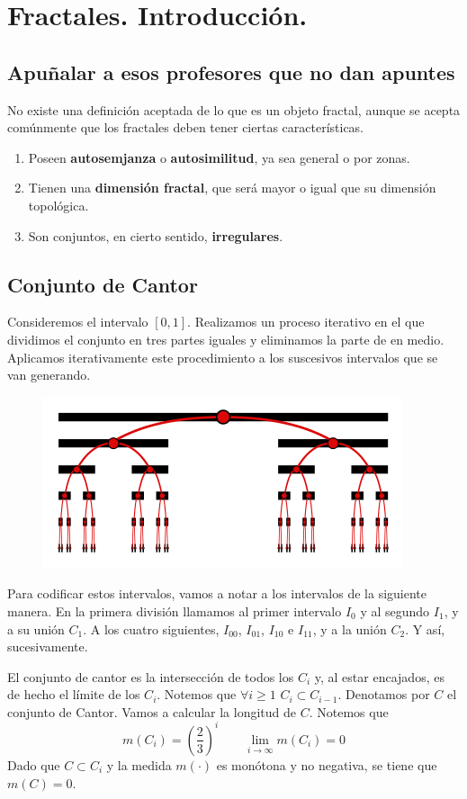 \documentclass[FyPI.tex]{subfiles}
\begin{document}
\chapter{Fractales. Introducción.}
\section{Apuñalar a esos profesores que no dan apuntes}
No existe una definición aceptada de lo que es un objeto fractal, aunque se acepta comúnmente que los fractales deben tener ciertas características.
\begin{enumerate}
\item Poseen \textbf{autosemjanza} o \textbf{autosimilitud}, ya sea general o por zonas.
\item Tienen una \textbf{dimensión fractal}, que será mayor o igual que su dimensión topológica.
\item Son conjuntos, en cierto sentido, \textbf{irregulares}.
\end{enumerate}
\section{Conjunto de Cantor}
Consideremos el intervalo $[0,1]$. Realizamos un proceso iterativo en el que dividimos el conjunto en tres partes iguales y eliminamos la parte de en medio. Aplicamos iterativamente este procedimiento a los suscesivos intervalos que se van generando. 
\begin{figure}[h!]
\centering
\includegraphics[scale=0.7]{prueba}
\end{figure}
Para codificar estos intervalos, vamos a notar a los intervalos de la siguiente manera. En la primera división llamamos al primer intervalo $I_0$ y al segundo $I_1$, y a su unión $C_1$. A los cuatro siguientes, $I_{00}$, $I_{01}$, $I_{10}$ e $I_{11}$, y a la unión $C_2$. Y así, sucesivamente.

El conjunto de cantor es la intersección de todos los $C_i$ y, al estar encajados, es de hecho el límite de los $C_i$. Notemos que $\forall i \geq 1$ $C_i \subset C_{i-1}$. Denotamos por $C$ el conjunto de Cantor. 
\newpage
Vamos a calcular la longitud de $C$. Notemos que
$$
m(C_i) = \left(\frac{2}{3}\right)^i \qquad \lim_{i\to\infty} m(C_i) = 0
$$
Dado que $C\subset C_i$  y la medida $m(\cdot)$ es monótona y no negativa, se tiene que $m(C)=0$.
\end{document}

